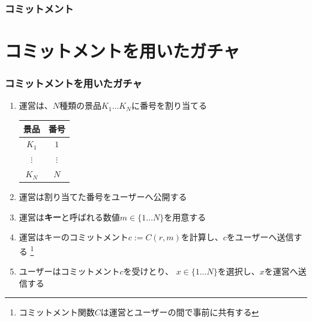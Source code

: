 \begin{frame}
  \frametitle{コミットメント}


\end{frame}


\section{コミットメントを用いたガチャ}

\begin{frame}
  \frametitle{コミットメントを用いたガチャ}
  
  \begin{enumerate}
    \item<2-> \label{item:assign}
      運営は、$N$種類の景品$K_1 \dots K_N$に番号を割り当てる
      \begin{table}[h]
        \begin{tabular}{c|c}
          景品 & 番号 \\
          \hline \hline
          $K_1$ & $1$ \\
          $\vdots$ & $\vdots$ \\
          $K_N$ & $N$ \\
        \end{tabular}
      \end{table}
    \item<3-> 運営は割り当てた番号をユーザーへ公開する
    \item<4-> 運営は\textbf{キー}と呼ばれる数値$m \in \{1 \dots N\}$を用意する
    \item<5-> 運営はキーのコミットメント$c := C(r, m)$を計算し、$c$をユーザーへ送信する%
      \footnote[frame]{コミットメント関数$C$は運営とユーザーの間で事前に共有する}
    \item<6-> ユーザーはコミットメント$c$を受けとり、
      $x \in \{1 \dots N\}$を選択し、$x$を運営へ送信する
  \end{enumerate}
\end{frame}

